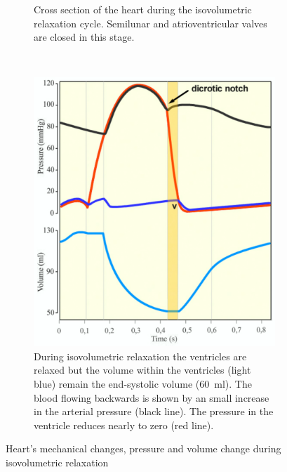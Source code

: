 \begin{figure}[!htpb]
	\begin{subfigure}[t]{0.48\textwidth}
		\centering
		\caption{Cross section of the heart during the isovolumetric relaxation cycle. Semilunar and atrioventricular valves are closed in this stage.}
		\label{fig:heart isovolumetric relaxation}
	\end{subfigure}
	~
	\begin{subfigure}[t]{0.48\textwidth}
		\centering
		\includegraphics[width=\textwidth,keepaspectratio]{figure_10}
		\caption{During isovolumetric relaxation the ventricles are relaxed but the volume within the ventricles (light blue) remain the end-systolic volume (\SI{60}{\milli\litre}). The blood flowing backwards is shown by an small increase in the arterial pressure (black line). The pressure in the ventricle reduces nearly to zero (red line).}
		\label{fig:pressure isovolumteric realxation}
	\end{subfigure}
	\caption[Isovolumetric relaxation]{Heart's mechanical changes, pressure and volume change during isovolumetric relaxation}
\end{figure}


